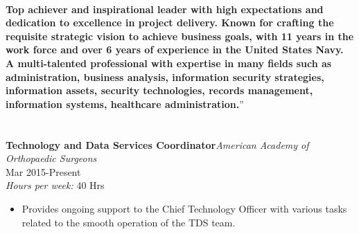 \documentclass[a4papper,overlapped,line]{res}
\newcommand{\jobdes}[3]{{\bf \large #1\hspace{2ex}}{{\em \small #2}}{\hfill #3}}
\newcommand{\osection}[1]{\section{\sc {\color{MidnightBlue}\vspace{-0.60cm} \textbf{#1}\\}}}
\newenvironment{changemargin}[2]{\begin{list}{}{
\setlength{\topsep}{0pt}\setlength{\leftmargin}{0pt}
 \setlength{\rightmargin}{0pt}
 \setlength{\listparindent}{\parindent}
 \setlength{\itemindent}{\parindent}
 \setlength{\parsep}{0pt plus 1pt}
 \addtolength{\leftmargin}{#1}\addtolength{\rightmargin}{#2}
 }\item }{\end{list}}
\begin{document}
\begin{resume}
\begin{changemargin}{-0.7cm}{-2.3cm}
{\setlength{\fboxsep}{18pt}
\colorbox{champagne}{
\begin{minipage}{0.95\textwidth}
\rmfamily
\begin{flushleft}
\\
\vspace{-0.65cm}
\begin{small}
\textbf{Top achiever and inspirational leader with high expectations and dedication to excellence in project delivery. Known for crafting the requisite strategic vision to achieve business goals, with 11 years in the work force and over 6 years of experience in the United States Navy. A multi-talented professional with expertise in many fields such as administration, business analysis, information security strategies, information assets, security technologies, records management, information systems, healthcare administration.}\textquotedblright
\end{small}\end{flushleft}
\end{minipage}}}
\end{changemargin}
\vspace*{-2.5mm}
\vspace{0.50cm}
\setlength\parindent{0pt}
\osection{CAREER HISTORY}
\vspace{0.20cm}
\jobdes{Technology and Data Services Coordinator}{American Academy of Orthopaedic Surgeons} \\Mar 2015-Present\\
\textit{Hours per week:} 40 Hrs
\vspace{0.20cm}
\begin{itemize}
	\item Provides ongoing support to the Chief Technology Officer with various tasks related to the smooth operation of the TDS team. 

\end{itemize}
\end{resume}
\end{document}
